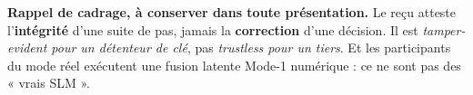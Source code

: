\documentclass[10pt]{article}
\begin{document}
\vspace{4pt}
\begin{these}
\small\textbf{Rappel de cadrage, à conserver dans toute présentation.} Le reçu atteste l'\textbf{intégrité}
d'une suite de pas, jamais la \textbf{correction} d'une décision. Il est \emph{tamper-evident pour un
détenteur de clé}, pas \emph{trustless pour un tiers}. Et les participants du mode réel exécutent une
fusion latente Mode-1 numérique : ce ne sont pas des « vrais SLM ».
\end{these}
\end{document}
